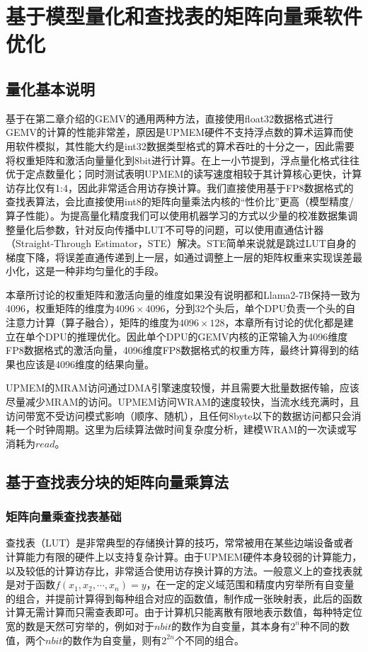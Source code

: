 \chapter{基于模型量化和查找表的矩阵向量乘软件优化}

\section{量化基本说明}
基于在第二章介绍的GEMV的通用两种方法，直接使用float32数据格式进行GEMV的计算的性能非常差，原因是UPMEM硬件不支持浮点数的算术运算而使用软件模拟，其性能大约是int32数据类型格式的算术吞吐的十分之一\cite{BenchmarkingMutlu}，因此需要将权重矩阵和激活向量量化到8bit进行计算。在上一小节提到，浮点量化格式往往优于定点数量化\cite{ZeroQuantFP}；同时测试表明UPMEM的读写速度相较于其计算核心更快，计算访存比仅有1:4\cite{BenchmarkingMutlu}，因此非常适合用访存换计算。我们直接使用基于FP8数据格式的查找表算法，会比直接使用int8的矩阵向量乘法内核的“性价比”更高（模型精度/算子性能）。为提高量化精度我们可以使用机器学习的方式以少量的校准数据集调整量化后参数，针对反向传播中LUT不可导的问题，可以使用直通估计器（Straight-Through Estimator，STE）解决\cite{NonuniformQuant}。STE简单来说就是跳过LUT自身的梯度下降，将误差直通传递到上一层，如通过调整上一层的矩阵权重来实现误差最小化，这是一种非均匀量化的手段。

本章所讨论的权重矩阵和激活向量的维度如果没有说明都和Llama2-7B保持一致为4096，权重矩阵的维度为$4096\times 4096$，分到32个头后，单个DPU负责一个头的自注意力计算（算子融合），矩阵的维度为$4096\times 128$，本章所有讨论的优化都是建立在单个DPU的推理优化。因此单个DPU的GEMV内核的正常输入为4096维度FP8数据格式的激活向量，4096维度FP8数据格式的权重方阵，最终计算得到的结果也应该是4096维度的结果向量。

UPMEM的MRAM访问通过DMA引擎速度较慢，并且需要大批量数据传输，应该尽量减少MRAM的访问。UPMEM访问WRAM的速度较快，当流水线充满时，且访问带宽不受访问模式影响（顺序、随机），且任何8byte以下的数据访问都只会消耗一个时钟周期。这里为后续算法做时间复杂度分析，建模WRAM的一次读或写消耗为$read$。

\section{基于查找表分块的矩阵向量乘算法}
\subsection{矩阵向量乘查找表基础}
查找表（LUT）是非常典型的存储换计算的技巧，常常被用在某些边端设备或者计算能力有限的硬件上以支持复杂计算。由于UPMEM硬件本身较弱的计算能力，以及较低的计算访存比，非常适合使用访存换计算的方法。一般意义上的查找表就是对于函数$f(x_1,x_2,\cdots,x_n)=y$，在一定的定义域范围和精度内穷举所有自变量的组合，并提前计算得到每种组合对应的函数值，制作成一张映射表，此后的函数计算无需计算而只需查表即可。由于计算机只能离散有限地表示数值，每种特定位宽的数是天然可穷举的，例如对于$n bit$的数作为自变量，其本身有$2^n$种不同的数值，两个$n bit$的数作为自变量，则有$2^{2n}$个不同的组合。

